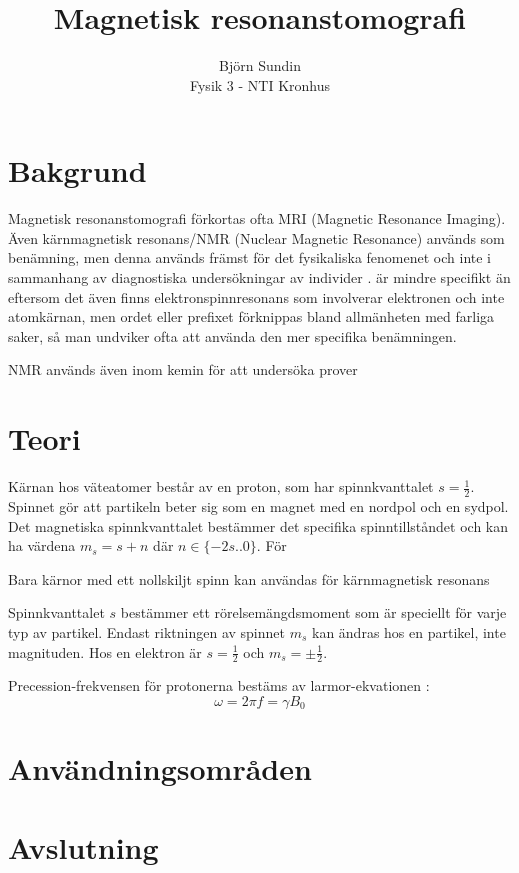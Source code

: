 \documentclass[11pt, a4paper]{article}
\title{Magnetisk resonanstomografi}
\author{Björn Sundin\medskip\\\normalsize Fysik 3 - NTI Kronhus}
\begin{document}
\maketitle

\clearpage
\section{Bakgrund}


Magnetisk resonanstomografi förkortas ofta MRI (Magnetic Resonance Imaging). Även kärnmagnetisk resonans/NMR (Nuclear Magnetic Resonance) används som benämning, men denna används främst för det fysikaliska fenomenet och inte i sammanhang av diagnostiska undersökningar av individer \parencite{nmr_eller_mri}.  är mindre specifikt än  eftersom det även finns elektronspinnresonans som involverar elektronen och inte atomkärnan, men ordet  eller prefixet  förknippas bland allmänheten med farliga saker, så man undviker ofta att använda den mer specifika benämningen.

NMR används även inom kemin för att undersöka prover

\parencite{mri_lärobok}

\clearpage
\section{Teori}
Kärnan hos väteatomer består av en proton, som har spinnkvanttalet $s=\frac{1}{2}$. Spinnet gör att partikeln beter sig som en magnet med en nordpol och en sydpol. Det magnetiska spinnkvanttalet bestämmer det specifika spinntillståndet och kan ha värdena $m_s=s+n$ där $n\in\{-2s..0\}$. För 

Bara kärnor med ett nollskiljt spinn kan användas för kärnmagnetisk resonans

Spinnkvanttalet $s$ bestämmer ett rörelsemängdsmoment som är speciellt för varje typ av partikel. Endast riktningen av spinnet $m_s$ kan ändras hos en partikel, inte magnituden. Hos en elektron är $s=\frac{1}{2}$ och $m_s=\pm\frac{1}{2}$.

Precession-frekvensen för protonerna bestäms av larmor-ekvationen \parencite{larmor_frekvens}:
\begin{equation}
    \omega=2\pi f=\gamma B_0
\end{equation}

\clearpage
\section{Användningsområden}


\clearpage
\section{Avslutning}

\clearpage
\printbibliography
\end{document}
